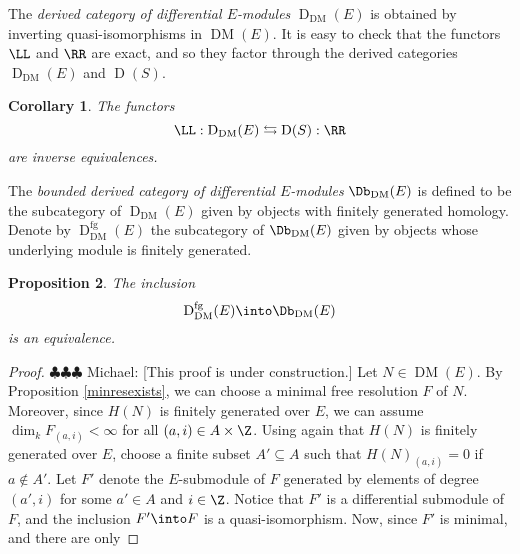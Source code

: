 \documentclass[12pt]{amsart}
\newtheorem{lemma}{Lemma}[section]
\newtheorem{prop}[lemma]{Proposition}
\newtheorem{cor}[lemma]{Corollary}
\theoremstyle{definition}
\theoremstyle{remark}
\newcommand{\michael}[1]{{\color{red} \sf $\clubsuit\clubsuit\clubsuit$ Michael: [#1]}}
\def\on{\operatorname}
\def\DM{\operatorname{DM}}
\begin{document}
The \emph{derived category of differential $E$-modules} $\on{D}_{\DM}(E)$ is obtained by inverting quasi-isomorphisms in $\DM(E)$. It is easy to check that the functors $\LL$ and $\RR$ are exact, and so they factor through the derived categories $\on{D}_{\DM}(E)$ and $\on{D}(S)$. 

\begin{cor} 
\label{derived}
The functors
$$
\LL : \on{D}_{\DM}(E) \leftrightarrows \on{D}(S) : \RR
$$
are inverse equivalences.
\end{cor}

The \emph{bounded derived category of differential $E$-modules} $\Db_{\DM}(E)$ is defined to be the subcategory of $\on{D}_{\DM}(E)$ given by objects with finitely generated homology. Denote by $\on{D}^{\on{fg}}_{\DM}(E)$ the subcategory of $\Db_{\DM}(E)$ given by objects whose underlying module is finitely generated. 

\iffalse
We first fix some notation. If $(N, \del) \in \DM(E)$ and $i \ge \Z$, let $N_i = \bigoplus_{a \in A} N_{(a, i)}$. For $j \in \Z$, let $\tau_{\ge j} N$ denote the $E$-submodule of $N$ generated by $(\bigoplus_{i > j} N_i) \oplus \ker(\del |_{N_{j}})$; note that this is a differential submodule of $(N, \del)$. Define $\tau_{\le j} = \cone(\tau_{\ge j + 1}N  \into N)$. 

\begin{lemma}
\label{truncation}
Let $N \in \DM(E)$. We have
$$
H(\tau_{\ge j} N)_i = \begin{cases} H(N)_i, & i \ge j \\ 0, & i < j \end{cases}
$$
and
$$
H(\tau_{\le j} N)_i = \begin{cases} H(N)_i, & i \le j \\ 0, & i > j. \end{cases}
$$
\end{lemma}

\begin{proof}
\michael{Fill in.}
\end{proof}
\fi

\begin{prop}
\label{fg}
The inclusion 
$$
\on{D}^{\on{fg}}_{\DM}(E) \into \Db_{\DM}(E)
$$
is an equivalence.
\end{prop}

\begin{proof}
\michael{This proof is under construction.}
Let $N \in \DM(E)$. By Proposition \ref{minresexists}, we can choose a minimal free resolution $F$ of $N$. Moreover, since $H(N)$ is finitely generated over $E$, we can assume $\dim_k F_{(a, i)} < \infty$ for all $(a, i) \in A \times \Z$. 
Using again that $H(N)$ is finitely generated over $E$, choose a finite subset $A' \subseteq A$ such that $H(N)_{(a, i)} = 0$ if $a \notin A'$. Let $F'$ denote the $E$-submodule of $F$ generated by elements of degree $(a', i)$ for some $a' \in A$ and $i \in \Z$. Notice that $F'$ is a differential submodule of $F$, and the inclusion $F' \into F$ is a quasi-isomorphism. Now, since $F'$ is minimal, and there are only 
\end{proof}
\end{document}
